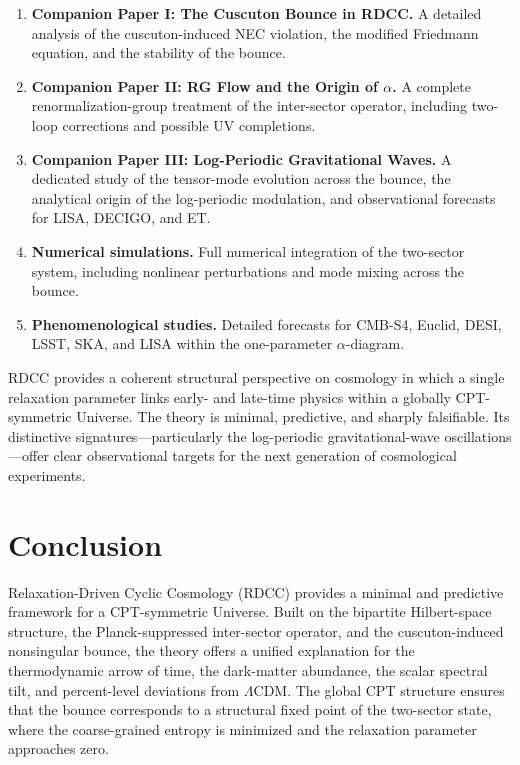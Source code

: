 \documentclass[11pt,a4paper]{article}
\begin{document}
\begin{enumerate}
    \item \textbf{Companion Paper I: The Cuscuton Bounce in RDCC.}
    A detailed analysis of the cuscuton-induced NEC violation, the modified
    Friedmann equation, and the stability of the bounce.

    \item \textbf{Companion Paper II: RG Flow and the Origin of \(\alpha\).}
    A complete renormalization-group treatment of the inter-sector operator,
    including two-loop corrections and possible UV completions.

    \item \textbf{Companion Paper III: Log-Periodic Gravitational Waves.}
    A dedicated study of the tensor-mode evolution across the bounce, the
    analytical origin of the log-periodic modulation, and observational
    forecasts for LISA, DECIGO, and ET.

    \item \textbf{Numerical simulations.}
    Full numerical integration of the two-sector system, including nonlinear
    perturbations and mode mixing across the bounce.

    \item \textbf{Phenomenological studies.}
    Detailed forecasts for CMB-S4, Euclid, DESI, LSST, SKA, and LISA within the
    one-parameter \(\alpha\)-diagram.
\end{enumerate}

RDCC provides a coherent structural perspective on cosmology in which a single
relaxation parameter links early- and late-time physics within a globally
CPT-symmetric Universe. The theory is minimal, predictive, and sharply
falsifiable. Its distinctive signatures—particularly the log-periodic
gravitational-wave oscillations—offer clear observational targets for the next
generation of cosmological experiments.

\clearpage

\section{Conclusion}

Relaxation-Driven Cyclic Cosmology (RDCC) provides a minimal and predictive
framework for a CPT-symmetric Universe. Built on the bipartite Hilbert-space
structure, the Planck-suppressed inter-sector operator, and the
cuscuton-induced nonsingular bounce, the theory offers a unified explanation for
the thermodynamic arrow of time, the dark-matter abundance, the scalar spectral
tilt, and percent-level deviations from \(\Lambda\)CDM. The global CPT structure
ensures that the bounce corresponds to a structural fixed point of the two-sector
state, where the coarse-grained entropy is minimized and the relaxation
parameter approaches zero.
\end{document}
